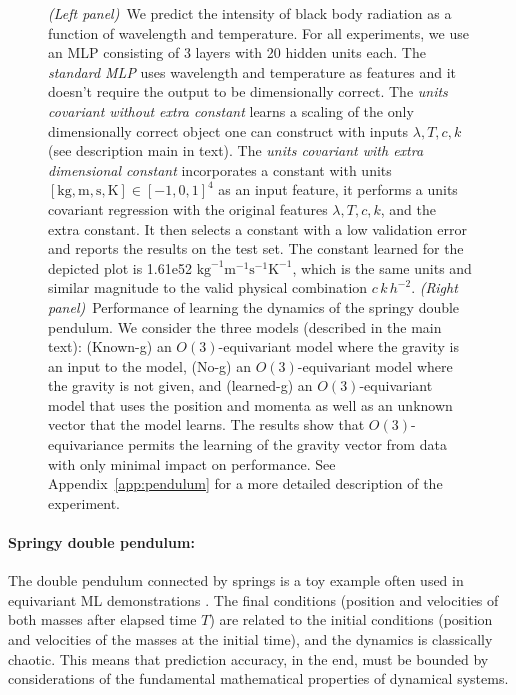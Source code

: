 \documentclass[]{article} %
\newcommand{\appref}[1]{Appendix~\ref{#1}}
\newcommand{\unit}[1]{\mathrm{#1}}
\newcommand{\kg}{\unit{kg}}
\newcommand{\m}{\unit{m}}
\newcommand{\s}{\unit{s}}
\newcommand{\K}{\unit{K}}
\begin{document}
\begin{figure}[t!]
    \caption{\textsl{(Left panel)}~We predict the intensity of black body radiation as a function of wavelength and temperature. For all experiments, we use an MLP consisting of 3 layers with 20 hidden units each. The \emph{standard MLP} uses wavelength and temperature as features and it doesn't require the output to be dimensionally correct. The \emph{units covariant without extra constant} learns a scaling of the only dimensionally correct object one can construct with inputs $\lambda, T, c, k$ (see description main in text). The \emph{units covariant with extra dimensional constant} incorporates a constant with units $[\kg, \m, \s, \K]\in[-1,0,1]^4$ as an input feature, it performs a units covariant regression with the original features $\lambda, T, c, k$, and the extra constant. It then selects a constant with a low validation error and reports the results on the test set. The constant learned for the depicted plot is 1.61e52 $\kg^{-1}\m^{-1}\s^{-1}\K^{-1}$, which is the same units and similar magnitude to the valid physical combination $c\,k\,h^{-2}$. 
    \textsl{(Right panel)}~Performance of learning the dynamics of the springy double pendulum. We consider the three models (described in the main text): (Known-g) an $O(3)$-equivariant model where the gravity is an input to the model, (No-g) an $O(3)$-equivariant model where the gravity is not given, and (learned-g) an $O(3)$-equivariant model that uses the position and momenta as well as an unknown vector that the model learns. The results show that $O(3)$-equivariance permits the learning of the gravity vector from data with only minimal impact on performance. See \appref{app:pendulum} for a more detailed description of the experiment.}
    \label{fig:exps}
\end{figure}

\paragraph{Springy double pendulum:}
The double pendulum connected by springs is a toy example often used in equivariant ML demonstrations \citep{finzi2021practical,yao2021simple, villar2022dimensionless}. 
The final conditions (position and velocities of both masses after elapsed time $T$) are related to the initial conditions (position and velocities of the masses at the initial time), and the dynamics is classically chaotic.
This means that prediction accuracy, in the end, must be bounded by considerations of the fundamental mathematical properties of dynamical systems.
\end{document}
